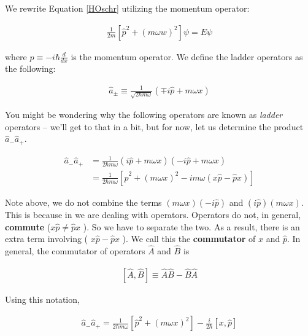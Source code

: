 We rewrite Equation \ref{HOschr} utilizing the momentum operator: 

\begin{align} \label{}
  \frac{1}{2m}\left[ \hat{p}^2 + (m\omega w)^2 \right] \psi = E\psi
\end{align}\vspace{3px}

where $\hat{p}\equiv -i\hbar \frac{d}{dx}$ is the momentum operator. We define
the ladder operators as the following: 

\begin{align} \label{}
  \hat{a}_\pm \equiv \frac{1}{\sqrt{2\hbar m\omega}}(\mp i \hat{p} + m\omega x)
\end{align}\vspace{3px}

You might be wondering why the following operators are known as \textit{ladder}
operators -- we'll get to that in a bit, but for now, let us determine the
product $\hat{a}_- \hat{a}_+$. 

\begin{align} \label{}
  \hat{a}_- \hat{a}_+ &= \frac{1}{2\hbar m \omega} (i \hat{p} + m\omega x)(-i
  \hat{p} + m\omega x) \\ &= \frac{1}{2\hbar m \omega} \left[ \hat{p}^2
  + (m\omega x)^2 - im\omega (x \hat{p} - \hat{p} x) \right]
\end{align}\vspace{3px} 

Note above, we do not combine the terms $(m\omega x)(-i \hat{p})$ and $(i
\hat{p})(m\omega x)$. This is because in we are dealing with operators.
Operators do not, in general, \textbf{commute} ($x \hat{p} \neq \hat{p}x$ ). So
we have to separate the two. As a result, there is an extra term involving ( $x
\hat{p} - \hat{p} x$ ). We call this the \textbf{commutator} of $x$ and
$\hat{p}$. In general, the commutator of operators $\hat{A}$ and $\hat{B}$ is 

\begin{align} \label{commutator}
  [\hat{A}, \hat{B}] \equiv \hat{A}\hat{B} - \hat{B}\hat{A}
\end{align}\vspace{3px}

Using this notation, 

\begin{align} \label{a-a+}
  \hat{a}_- \hat{a}_+ = \frac{1}{2\hbar m \omega}\left[ \hat{p}^2 + (m\omega
  x)^2 \right] - \frac{i}{2\hbar}[x, \hat{p}]
\end{align}\vspace{3px}

